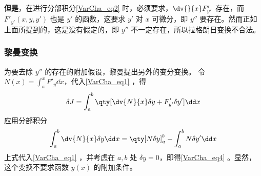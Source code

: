 \textbf{但是}，在进行分部积分\autoref{VarCha_eq2} 时，必须要求，$\dv{}{x}F'_{y'}$ 存在，而 $F'_{y'}(x,y,y')$ 也是 $y'$ 的函数，这要求 $y'$ 对 $x$ 可微分，即 $y''$ 要存在。然而正如上面所提到的，这是没有假定的，即 $y''$ 不一定存在，所以拉格朗日变换不合法。
\subsubsection{黎曼变换}
为要去除 $y''$ 的存在的附加假设，黎曼提出另外的变分变换。
令 $N(x)=\int_a^xF'_y\dd x$，代入\autoref{VarCha_eq1} ，得
\begin{equation}
\delta J=\int_a^b\qty[\dv{N}{x}\delta y+F'_{y'}\delta y']\dd x
\end{equation}
应用分部积分
\begin{equation}
\int_a^b\dv{N}{x}\delta y\dd x=\qty[N\delta y]_a^b-\int_a^bN\delta y'\dd x
\end{equation}
上式代入\autoref{VarCha_eq1} ，并考虑在 $a,b$ 处 $\delta y=0$，即得\autoref{VarCha_eq4} 。显然，这个变换不要求函数 $y(x)$ 的附加条件。
